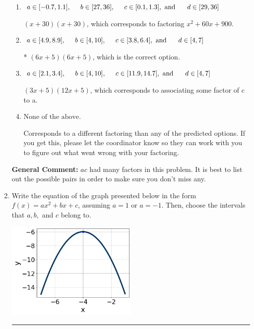 \documentclass{extbook}[14pt]
\newcommand{\litem}[1]{\item #1

\rule{\textwidth}{0.4pt}}
\begin{document}
\begin{enumerate}
{\begin{enumerate}[label=\Alph*.]
 $(18x + 5)(2x + 5)$, which corresponds to associating some factor of a to c.
\item \( a \in [-0.7, 1.1], \hspace*{5mm} b \in [27, 36], \hspace*{5mm} c \in [0.1, 1.3], \text{ and } \hspace*{5mm} d \in [29, 36] \)

 $(x + 30)(x + 30)$, which corresponds to factoring $x^{2} +60 x + 900$.
\item \( a \in [4.9, 8.9], \hspace*{5mm} b \in [4, 10], \hspace*{5mm} c \in [3.8, 6.4], \text{ and } \hspace*{5mm} d \in [4, 7] \)

* $(6x + 5)(6x + 5)$, which is the correct option.
\item \( a \in [2.1, 3.4], \hspace*{5mm} b \in [4, 10], \hspace*{5mm} c \in [11.9, 14.7], \text{ and } \hspace*{5mm} d \in [4, 7] \)

 $(3x + 5)(12x + 5)$, which corresponds to associating some factor of c to a.
\item \( \text{None of the above.} \)

 Corresponds to a different factoring than any of the predicted options. If you get this, please let the coordinator know so they can work with you to figure out what went wrong with your factoring.
\end{enumerate}

\textbf{General Comment:} $ac$ had many factors in this problem. It is best to list out the possible pairs in order to make sure you don't miss any.
}
\litem{
Write the equation of the graph presented below in the form $f(x)=ax^2+bx+c$, assuming  $a=1$ or $a=-1$. Then, choose the intervals that $a, b,$ and $c$ belong to.

\begin{center}
    \includegraphics[width=0.5\textwidth]{../Figures/quadraticGraphToEquationC.png}
\end{center}


}
\end{enumerate}
\end{document}
